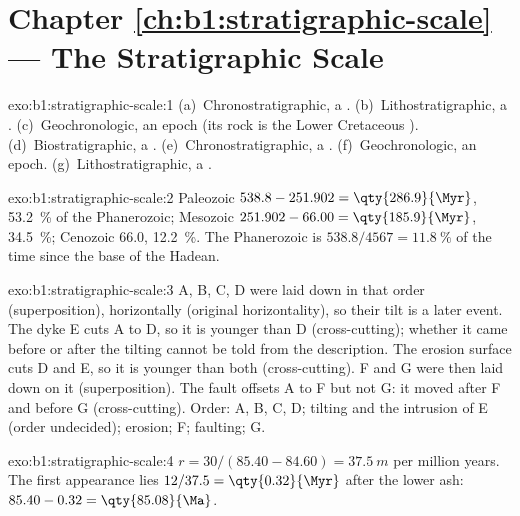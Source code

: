 \section*{Chapter \ref{ch:b1:stratigraphic-scale} --- The Stratigraphic Scale}

\begin{solution}{exo:b1:stratigraphic-scale:1}
(a)~Chronostratigraphic, a . (b)~Lithostratigraphic, a .
(c)~Geochronologic, an epoch (its rock is the Lower Cretaceous ).
(d)~Biostratigraphic, a . (e)~Chronostratigraphic, a .
(f)~Geochronologic, an epoch. (g)~Lithostratigraphic, a .
\end{solution}

\begin{solution}{exo:b1:stratigraphic-scale:2}
Paleozoic $538.8 - 251.902 = \qty{286.9}{\Myr}$, \qty{53.2}{\%} of the
Phanerozoic; Mesozoic $251.902 - 66.00 = \qty{185.9}{\Myr}$, \qty{34.5}{\%};
Cenozoic \qty{66.0}{\Myr}, \qty{12.2}{\%}. The Phanerozoic is
$538.8/4567 = \qty{11.8}{\%}$ of the time since the base of the Hadean.
\end{solution}

\begin{solution}{exo:b1:stratigraphic-scale:3}
A, B, C, D were laid down in that order (superposition), horizontally (original
horizontality), so their tilt is a later event. The dyke E cuts A to D, so it is
younger than D (cross-cutting); whether it came before or after the tilting
cannot be told from the description. The erosion surface cuts D and E, so it is
younger than both (cross-cutting). F and G were then laid down on it
(superposition). The fault offsets A to F but not G: it moved after F and before G
(cross-cutting). Order: A, B, C, D; tilting and the intrusion of E (order
undecided); erosion; F; faulting; G.
\end{solution}

\begin{solution}{exo:b1:stratigraphic-scale:4}
$r = 30/(85.40 - 84.60) = \qty{37.5}{m}$ per million years. The first appearance
lies $12/37.5 = \qty{0.32}{\Myr}$ after the lower ash: $85.40 - 0.32 =
\qty{85.08}{\Ma}$.
\end{solution}

